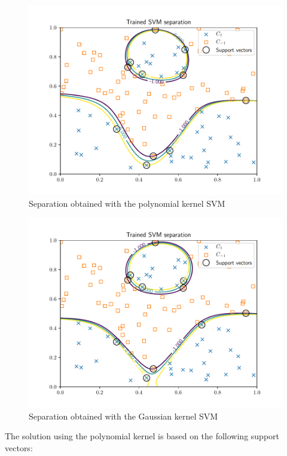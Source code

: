 \documentclass[letterpaper,headings=standardclasses]{scrartcl}
\begin{document}
\begin{figure}[h]
    \centering
    \includegraphics[width=0.7\linewidth]{sep_poly.pdf}
    \caption{Separation obtained with the polynomial kernel SVM}
    \label{sep_poly}
\end{figure}

\begin{figure}[h]
    \centering
    \includegraphics[width=0.7\linewidth]{sep_exp.pdf}
    \caption{Separation obtained with the Gaussian kernel SVM}
    \label{sep_exp}
\end{figure}

The solution using the polynomial kernel is based on the following support vectors:
\end{document}

